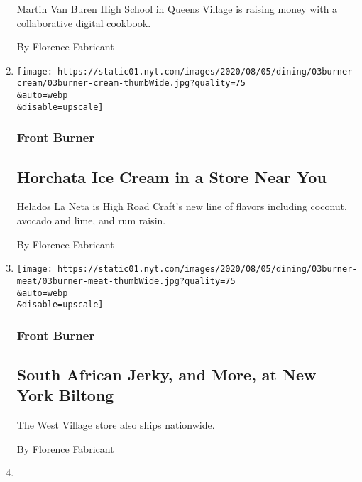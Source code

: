 \begin{enumerate}
  Martin Van Buren High School in Queens Village is raising money with a
  collaborative digital cookbook.

  By Florence Fabricant
\item
  \href{/2020/08/03/dining/mexican-ice-cream.html}{}

  \texttt{[image: https://static01.nyt.com/images/2020/08/05/dining/03burner-cream/03burner-cream-thumbWide.jpg?quality=75\\\&auto=webp\\\&disable=upscale]}

  \hypertarget{front-burner-2}{%
  \subsubsection{Front Burner}\label{front-burner-2}}

  \hypertarget{horchata-ice-cream-in-a-store-near-you}{%
  \subsection{Horchata Ice Cream in a Store Near
  You}\label{horchata-ice-cream-in-a-store-near-you}}

  Helados La Neta is High Road Craft's new line of flavors including
  coconut, avocado and lime, and rum raisin.

  By Florence Fabricant
\item
  \href{/2020/08/03/dining/new-york-biltong.html}{}

  \texttt{[image: https://static01.nyt.com/images/2020/08/05/dining/03burner-meat/03burner-meat-thumbWide.jpg?quality=75\\\&auto=webp\\\&disable=upscale]}

  \hypertarget{front-burner-3}{%
  \subsubsection{Front Burner}\label{front-burner-3}}

  \hypertarget{south-african-jerky-and-more-at-new-york-biltong}{%
  \subsection{South African Jerky, and More, at New York
  Biltong}\label{south-african-jerky-and-more-at-new-york-biltong}}

  The West Village store also ships nationwide.

  By Florence Fabricant
\item
  \href{/2020/08/03/dining/marcus-samuelsson-fried-chicken-delivery.html}{}


\end{enumerate}
